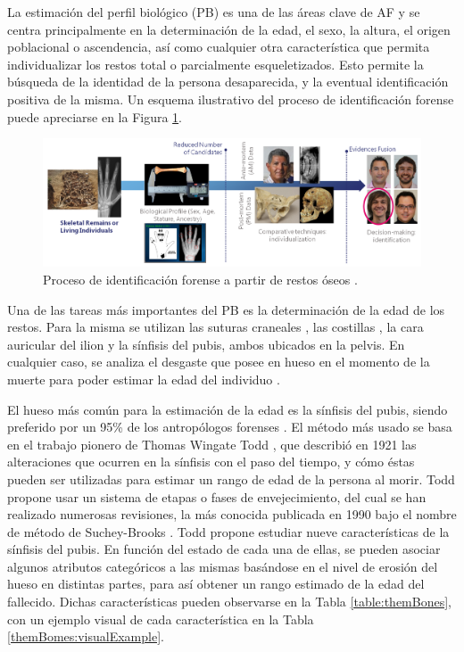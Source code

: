 La estimación del perfil biológico (PB) es una de las áreas clave de AF y se centra principalmente en la determinación de la edad, el sexo, la altura, el origen poblacional o ascendencia, así como cualquier otra característica que permita individualizar los restos total o parcialmente esqueletizados. Esto permite la búsqueda de la identidad de la persona desaparecida, y la eventual identificación positiva de la misma. Un esquema ilustrativo del proceso de identificación forense puede apreciarse en la Figura \ref{fig:intro_1}.

\begin{figure}[h]
    \centering
    \includegraphics[width=1\linewidth]{imagenes/introduction/intro_1.png}
    \caption[Proceso de identificación forense a partir de restos óseos]{Proceso de identificación forense a partir de restos óseos \cite{RefWorks:RefID:21-mesejo2020survey}.}
    \label{fig:intro_1}
\end{figure}

Una de las tareas más importantes del PB es la determinación de la edad de los restos. Para la misma se utilizan las suturas craneales \cite{skullAF}, las costillas \cite{icscan1984age}, la cara auricular del ilion \cite{buckberry_age_2002} y la sínfisis del pubis, ambos ubicados en la pelvis. En cualquier caso, se analiza el desgaste que posee en hueso en el momento de la muerte para poder estimar la edad del individuo \cite{RefWorks:RefID:12-black2011forensic}. 

El hueso más común para la estimación de la edad es la sínfisis del pubis, siendo preferido por un 95\% de los antropólogos forenses \cite{garvin_current_2012}. El método más usado se basa en el trabajo pionero de Thomas Wingate Todd \cite{RefWorks:RefID:19-todd1921age}, que describió en 1921 las alteraciones que ocurren en la sínfisis con el paso del tiempo, y cómo éstas pueden ser utilizadas para estimar un rango de edad de la persona al morir. Todd propone usar un sistema de etapas o fases de envejecimiento, del cual se han realizado numerosas revisiones, la más conocida publicada en 1990 bajo el nombre de método de Suchey-Brooks \cite{RefWorks:RefID:20-brooks1990skeletal}. Todd propone estudiar nueve características de la sínfisis del pubis. En función del estado de cada una de ellas, se pueden asociar algunos atributos categóricos a las mismas basándose en el nivel de erosión del hueso en distintas partes, para así obtener un rango estimado de la edad del fallecido. Dichas características pueden observarse en la Tabla \ref{table:themBones}, con un ejemplo visual de cada característica en la Tabla \ref{themBomes:visualExample}.

